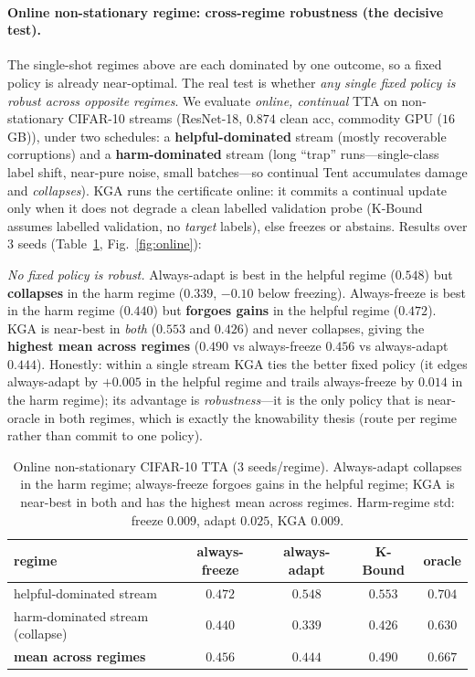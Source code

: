 \documentclass[11pt]{article}
\theoremstyle{plain}
\theoremstyle{definition}
\begin{document}
\paragraph{Online non-stationary regime: cross-regime robustness (the decisive test).}
The single-shot regimes above are each dominated by one outcome, so a fixed policy is
already near-optimal. The real test is whether \emph{any single fixed policy is robust
across opposite regimes}. We evaluate \emph{online, continual} TTA on non-stationary
CIFAR-10 streams (ResNet-18, $0.874$ clean acc, commodity GPU ($16$\,GB)), under two schedules:
a \textbf{helpful-dominated} stream (mostly recoverable corruptions) and a
\textbf{harm-dominated} stream (long ``trap'' runs---single-class label shift, near-pure
noise, small batches---so continual Tent accumulates damage and \emph{collapses}).
\textsc{KGA} runs the certificate online: it commits a continual update only when it does
not degrade a clean labelled validation probe (K-Bound assumes labelled validation, no
\emph{target} labels), else freezes or abstains. Results over $3$ seeds
(Table~\ref{tab:online}, Fig.~\ref{fig:online}):

\emph{No fixed policy is robust.} Always-adapt is best in the helpful regime ($0.548$) but
\textbf{collapses} in the harm regime ($0.339$, $-0.10$ below freezing). Always-freeze is
best in the harm regime ($0.440$) but \textbf{forgoes gains} in the helpful regime
($0.472$). \textsc{KGA} is near-best in \emph{both} ($0.553$ and $0.426$) and never
collapses, giving the \textbf{highest mean across regimes} ($0.490$ vs always-freeze
$0.456$ vs always-adapt $0.444$). Honestly: within a single stream \textsc{KGA} ties the
better fixed policy (it edges always-adapt by $+0.005$ in the helpful regime and trails
always-freeze by $0.014$ in the harm regime); its advantage is \emph{robustness}---it is
the only policy that is near-oracle in both regimes, which is exactly the knowability
thesis (route per regime rather than commit to one policy).

\begin{table}[h]\centering\small
\begin{tabular}{lcccc}
\toprule
regime & always-freeze & always-adapt & \textbf{K-Bound} & oracle \\
\midrule
helpful-dominated stream & $0.472$ & $0.548$ & $\mathbf{0.553}$ & $0.704$ \\
harm-dominated stream (collapse) & $0.440$ & $0.339$ & $0.426$ & $0.630$ \\
\midrule
\textbf{mean across regimes} & $0.456$ & $0.444$ & $\mathbf{0.490}$ & $0.667$ \\
\bottomrule
\end{tabular}
\caption{Online non-stationary CIFAR-10 TTA ($3$ seeds/regime). Always-adapt collapses in
the harm regime; always-freeze forgoes gains in the helpful regime; \textsc{KGA} is
near-best in both and has the highest mean across regimes. Harm-regime std: freeze
$0.009$, adapt $0.025$, KGA $0.009$.}
\label{tab:online}
\end{table}
\end{document}
